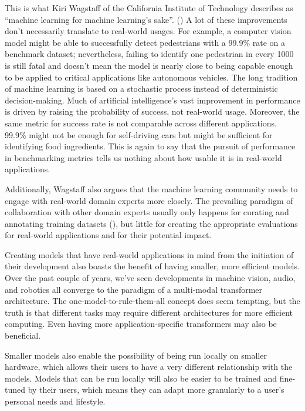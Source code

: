 \documentclass[12pt]{article}
\begin{document}
This is what Kiri Wagstaff of the California Institute of Technology describes as ``machine learning for machine learning's sake''. (\cite{10.5555/3042573.3042809}) A lot of these improvements don't necessarily translate to real-world usages. For example, a computer vision model might be able to successfully detect pedestrians with a 99.9\% rate on a benchmark dataset; nevertheless, failing to identify one pedestrian in every 1000 is still fatal and doesn't mean the model is nearly close to being capable enough to be applied to critical applications like autonomous vehicles. The long tradition of machine learning is based on a stochastic process instead of deterministic decision-making. Much of artificial intelligence's vast improvement in performance is driven by raising the probability of success, not real-world usage. Moreover, the same metric for success rate is not comparable across different applications. 99.9\% might not be enough for self-driving cars but might be sufficient for identifying food ingredients. This is again to say that the pursuit of performance in benchmarking metrics tells us nothing about how usable it is in real-world applications.

Additionally, Wagstaff also argues that the machine learning community needs to engage with real-world domain experts more closely. The prevailing paradigm of collaboration with other domain experts usually only happens for curating and annotating training datasets (\cite{10.1145/3411764.3445518}), but little for creating the appropriate evaluations for real-world applications and for their potential impact.

Creating models that have real-world applications in mind from the initiation of their development also boasts the benefit of having smaller, more efficient models. Over the past couple of years, we've seen developments in machine vision, audio, and robotics all converge to the paradigm of a multi-modal transformer architecture. The one-model-to-rule-them-all concept does seem tempting, but the truth is that different tasks may require different architectures for more efficient computing. Even having more application-specific transformers may also be beneficial.

Smaller models also enable the possibility of being run locally on smaller hardware, which allows their users to have a very different relationship with the models. Models that can be run locally will also be easier to be trained and fine-tuned by their users, which means they can adapt more granularly to a user's personal needs and lifestyle.
\end{document}
